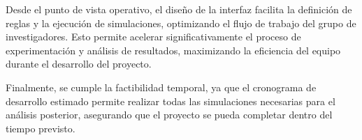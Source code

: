 Desde el punto de vista operativo, el diseño de la interfaz facilita la definición de reglas y la ejecución de simulaciones, optimizando el flujo de trabajo del grupo de investigadores. Esto permite acelerar significativamente el proceso de experimentación y análisis de resultados, maximizando la eficiencia del equipo durante el desarrollo del proyecto.

Finalmente, se cumple la factibilidad temporal, ya que el cronograma de desarrollo estimado permite realizar todas las simulaciones necesarias para el análisis posterior, asegurando que el proyecto se pueda completar dentro del tiempo previsto.


